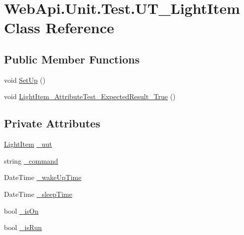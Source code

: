 \hypertarget{class_web_api_1_1_unit_1_1_test_1_1_u_t___light_item}{}\section{Web\+Api.\+Unit.\+Test.\+U\+T\+\_\+\+Light\+Item Class Reference}
\label{class_web_api_1_1_unit_1_1_test_1_1_u_t___light_item}
\subsection*{Public Member Functions}
\begin{DoxyCompactItemize}
\item 
void \mbox{\hyperlink{class_web_api_1_1_unit_1_1_test_1_1_u_t___light_item_aaa9a85cf841f31fceb2f10f1ff6ae4d1}{Set\+Up}} ()
\item 
void \mbox{\hyperlink{class_web_api_1_1_unit_1_1_test_1_1_u_t___light_item_adb2a3ea868b2956e11bb59b0fe940eb9}{Light\+Item\+\_\+\+Attribute\+Test\+\_\+\+Expected\+Result\+\_\+\+True}} ()
\end{DoxyCompactItemize}
\subsection*{Private Attributes}
\begin{DoxyCompactItemize}
\item 
\mbox{\hyperlink{class_f_w_p_s_1_1_models_1_1_light_item}{Light\+Item}} \mbox{\hyperlink{class_web_api_1_1_unit_1_1_test_1_1_u_t___light_item_a608a822e02178035cbda54c96fead4fe}{\+\_\+uut}}
\item 
string \mbox{\hyperlink{class_web_api_1_1_unit_1_1_test_1_1_u_t___light_item_a4089b3f8eede4e277f6e53397a938ab7}{\+\_\+command}}
\item 
Date\+Time \mbox{\hyperlink{class_web_api_1_1_unit_1_1_test_1_1_u_t___light_item_a659b97955c85eeb5b61ea436dddc45dd}{\+\_\+wake\+Up\+Time}}
\item 
Date\+Time \mbox{\hyperlink{class_web_api_1_1_unit_1_1_test_1_1_u_t___light_item_ab1009704864994731df0d9b0920946af}{\+\_\+sleep\+Time}}
\item 
bool \mbox{\hyperlink{class_web_api_1_1_unit_1_1_test_1_1_u_t___light_item_a533f2a48b7ea68386251dc4ec50bcc34}{\+\_\+is\+On}}
\item 
bool \mbox{\hyperlink{class_web_api_1_1_unit_1_1_test_1_1_u_t___light_item_a190fb01e3a53fa833bc57bf15776e0e9}{\+\_\+is\+Run}}
\end{DoxyCompactItemize}


